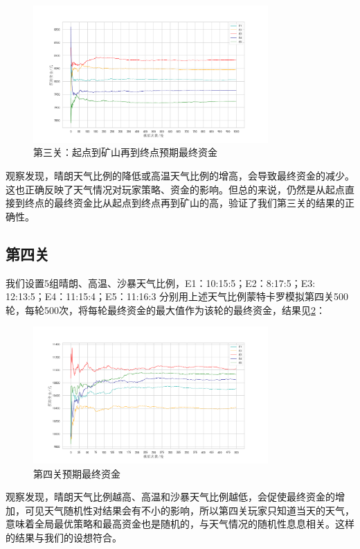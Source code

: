 \documentclass[withoutpre]{cumcmthesis} %
\begin{document}
\begin{figure}[H]
    \centering
    \includegraphics[width=0.8\textwidth]{figures/analysis3map2.png}
    \caption{第三关：起点到矿山再到终点预期最终资金}
    \label{fig:analysis3map2}
\end{figure}
观察发现，晴朗天气比例的降低或高温天气比例的增高，会导致最终资金的减少。这也正确反映了天气情况对玩家策略、资金的影响。但总的来说，仍然是从起点直接到终点的最终资金比从起点到终点再到矿山的高，验证了我们第三关的结果的正确性。

\subsection{第四关}
我们设置5组晴朗、高温、沙暴天气比例，E1：10:15:5；E2：8:17:5；E3: 12:13:5；E4：11:15:4；E5：11:16:3
分别用上述天气比例蒙特卡罗模拟第四关500轮，每轮500次，将每轮最终资金的最大值作为该轮的最终资金，结果见\cref{fig:analysis4}：
\begin{figure}[H]
    \centering
    \includegraphics[width=0.8\textwidth]{figures/anaysis4.png}
    \caption{第四关预期最终资金}
    \label{fig:analysis4}
\end{figure}
观察发现，晴朗天气比例越高、高温和沙暴天气比例越低，会促使最终资金的增加，可见天气随机性对结果会有不小的影响，所以第四关玩家只知道当天的天气，意味着全局最优策略和最高资金也是随机的，与天气情况的随机性息息相关。这样的结果与我们的设想符合。
\end{document}
